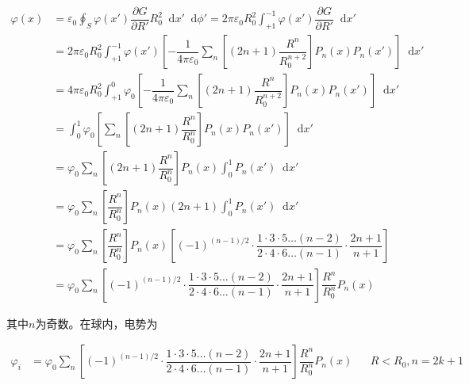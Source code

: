 \documentclass{article}
\newcommand*{\md}{\mathop{}\!\mathrm{d}}
\begin{document}
\begin{equation*}
  \begin{aligned}
    \varphi \left( x \right) &= \varepsilon_0 \oint_S \varphi \left( x' \right) \dfrac{\partial G}{\partial R'} R_0^2 \md x' \md \phi'
    = 2 \pi \varepsilon_0 R_0^2 \int_{+1}^{-1} \varphi \left( x' \right) \dfrac{\partial G}{\partial R'} \md x' \\
    &= 2 \pi \varepsilon_0 R_0^2 \int_{+1}^{-1} \varphi \left( x' \right) \left[ - \dfrac{1}{4\pi \varepsilon_0} \sum_n \left[ \left( 2n+1 \right) \dfrac{R^n }{R_0^{n+2}} \right] P_n \left( x \right) P_n \left( x' \right) \right] \md x' \\
    &= 4 \pi \varepsilon_0 R_0^2 \int_{+1}^{0} \varphi_0  \left[ - \dfrac{1}{4\pi \varepsilon_0} \sum_n \left[ \left( 2n+1 \right) \dfrac{R^n }{R_0^{n+2}} \right] P_n \left( x \right) P_n \left( x' \right) \right] \md x' \\
    &= \int_0^1 \varphi_0  \left[ \sum_n \left[ \left( 2n+1 \right) \dfrac{R^n }{R_0^n} \right] P_n \left( x \right) P_n \left( x' \right) \right] \md x' \\
    &= \varphi_0 \sum_n  \left[ \left( 2n+1 \right) \dfrac{R^n }{R_0^n} \right] P_n \left( x \right) \int_0^1  P_n \left( x' \right) \md x' \\
    &= \varphi_0 \sum_n  \left[  \dfrac{R^n }{R_0^n} \right] P_n \left( x \right) \left( 2n+1 \right) \int_0^1  P_n \left( x' \right) \md x' \\
    &= \varphi_0 \sum_n  \left[ \dfrac{R^n }{R_0^n} \right] P_n \left( x \right) \left[ \left( -1  \right)^{\left( n-1 \right)/ 2} \cdot \dfrac{1 \cdot 3 \cdot 5 \dots \left( n-2 \right)}{2 \cdot 4 \cdot 6 \dots \left( n-1 \right)} \cdot \dfrac{2n+1}{n+1} \right] \\
    &= \varphi_0 \sum_n  \left[ \left( -1  \right)^{\left( n-1 \right)/ 2} \cdot \dfrac{1 \cdot 3 \cdot 5 \dots \left( n-2 \right)}{2 \cdot 4 \cdot 6 \dots \left( n-1 \right)} \cdot \dfrac{2n+1}{n+1} \right] \dfrac{R^n }{R_0^n} P_n \left( x \right) 
  \end{aligned}
\end{equation*}

其中$n$为奇数。在球内，电势为

\begin{equation*}
  \begin{aligned}
    \varphi_i &=
    \varphi_0 \sum_n \left[ \left( -1  \right)^{\left( n-1 \right)/ 2} \cdot \dfrac{1 \cdot 3 \cdot 5 \dots \left( n-2 \right)}{2 \cdot 4 \cdot 6 \dots \left( n-1 \right)} \cdot \dfrac{2n+1}{n+1} \right] \dfrac{R^n }{R_0^n} P_n \left( x \right) && R<R_0,n=2k+1
  \end{aligned}
\end{equation*}
\end{document}
